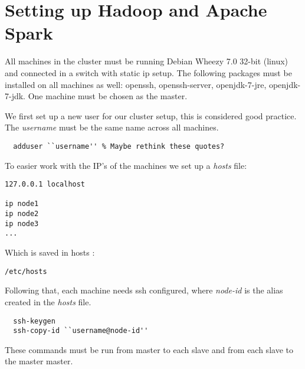 \section{Setting up Hadoop and Apache Spark}
\label{sec:hadoop}
All machines in the cluster must be running Debian Wheezy 7.0 32-bit (linux) and connected in a switch with static ip setup. The following packages must be installed on all machines as well: openssh, openssh-server, openjdk-7-jre, openjdk-7-jdk. One machine must be chosen as the master.

We first set up a new user for our cluster setup, this is considered good practice. The \emph{username} must be the same name across all machines.
\lstset{language=bash}
\begin{lstlisting}
  adduser ``username'' % Maybe rethink these quotes?
\end{lstlisting}
To easier work with the IP's of the machines we set up a \emph{hosts} file:
\begin{verbatim}
127.0.0.1 localhost

ip node1
ip node2
ip node3
...
\end{verbatim}
Which is saved in hosts : \begin{verbatim}/etc/hosts\end{verbatim}
Following that, each machine needs ssh configured, where \emph{node-id} is the alias created in the \emph{hosts} file.
\begin{lstlisting}
  ssh-keygen
  ssh-copy-id ``username@node-id''
\end{lstlisting}
These commands must be run from master to each slave and from each slave to the master master.

